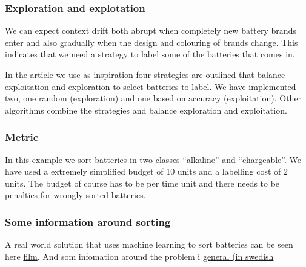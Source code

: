 \documentclass[11pt]{article}
\begin{document}
\hypertarget{exploration-and-explotation}{%
\subsubsection{Exploration and
explotation}\label{exploration-and-explotation}}

We can expect context drift both abrupt when completely new battery
brands enter and also gradually when the design and colouring of brands
change. This indicates that we need a strategy to label some of the
batteries that comes in.

In the \href{https://ieeexplore.ieee.org/document/6414645}{article} we
use as inspiration four strategies are outlined that balance
exploitation and exploration to select batteries to label. We have
implemented two, one random (exploration) and one based on accuracy
(exploitation). Other algorithms combine the strategies and balance
exploration and exploitation.

\hypertarget{metric}{%
\subsubsection{Metric}\label{metric}}

In this example we sort batteries in two classes ``alkaline'' and
``chargeable''. We have used a extremely simplified budget of 10 units
and a labelling cost of 2 units. The budget of course has to be per time
unit and there needs to be penalties for wrongly sorted batteries.

\hypertarget{some-information-around-sorting}{%
\subsubsection{Some information around
sorting}\label{some-information-around-sorting}}

A real world solution that uses machine learning to sort batteries can
be seen here
\href{https://www.youtube.com/watch?feature=player_embedded\&v=OugqnVO7WiU}{film}.
And som infomation around the problem i
\href{https://www.sopor.nu/fakta-om-sopor/vad-haender-med-din-sopa/elavfall/batterier}{general
(in swedish}
\end{document}
